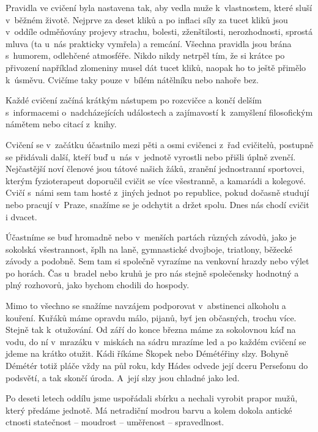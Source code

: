 \documentclass[a5paper, 11pt, twoside]{article}
\begin{document}
Pravidla ve cvičení byla nastavena tak, aby vedla muže k~vlastnostem,
které sluší v~běžném životě. Nejprve za deset kliků a po inflaci síly za
tucet kliků jsou v~oddíle odměňovány projevy strachu, bolesti,
zženštilosti, nerozhodnosti, sprostá mluva (ta u~nás prakticky vymřela)
a remcání. Všechna pravidla jsou brána s~humorem, odlehčené atmosféře.
Nikdo nikdy netrpěl tím, že si krátce po přivození například zlomeniny
musel dát tucet kliků, naopak ho to ještě přimělo k~úsměvu. Cvičíme taky
pouze v~bílém nátělníku nebo nahoře bez.

Každé cvičení začíná krátkým nástupem po rozcvičce a končí delším
s~informacemi o~nadcházejících událostech a zajímavostí k~zamyšlení
filosofickým námětem nebo citací z~knihy.

Cvičení se v~začátku účastnilo mezi pěti a osmi cvičenci z~řad
cvičitelů, postupně se přidávali další, kteří buď u~nás v~jednotě
vyrostli nebo přišli úplně zvenčí. Nejčastější noví členové jsou tátové
našich žáků, zranění jednostranní sportovci, kterým fyzioterapeut
doporučil cvičit se více všestranně, a kamarádi a kolegové. Cvičí s~námi
sem tam hosté z~jiných jednot po republice, pokud dočasně studují nebo
pracují v~Praze, snažíme se je odchytit a držet spolu. Dnes nás chodí
cvičit i dvacet.

Účastníme se buď hromadně nebo v~menších partách různých závodů, jako je
sokolská všestrannost, šplh na laně, gymnastické dvojboje, triatlony,
běžecké závody a podobně. Sem tam si společně vyrazíme na venkovní
hrazdy nebo výlet po horách. Čas u~bradel nebo kruhů je pro nás stejně
společensky hodnotný a plný rozhovorů, jako bychom chodili do hospody.

Mimo to všechno se snažíme navzájem podporovat v~abstinenci alkoholu a
kouření. Kuřáků máme opravdu málo, pijanů, byť jen občasných, trochu
více. Stejně tak k~otužování. Od září do konce března máme za sokolovnou
káď na vodu, do ní v~mrazáku v~miskách na sádru mrazíme led a po každém
cvičení se jdeme na krátko otužit. Kádi říkáme Škopek nebo Démétéřiny
slzy. Bohyně Démétér totiž pláče vždy na půl roku, kdy Hádes odvede její
dceru Persefonu do podsvětí, a tak skončí úroda. A~její slzy jsou
chladné jako led.

Po deseti letech oddílu jsme uspořádali sbírku a nechali vyrobit prapor
mužů, který předáme jednotě. Má netradiční modrou barvu a kolem dokola
antické ctnosti statečnost -- moudrost -- uměřenost -- spravedlnost.
\end{document}
